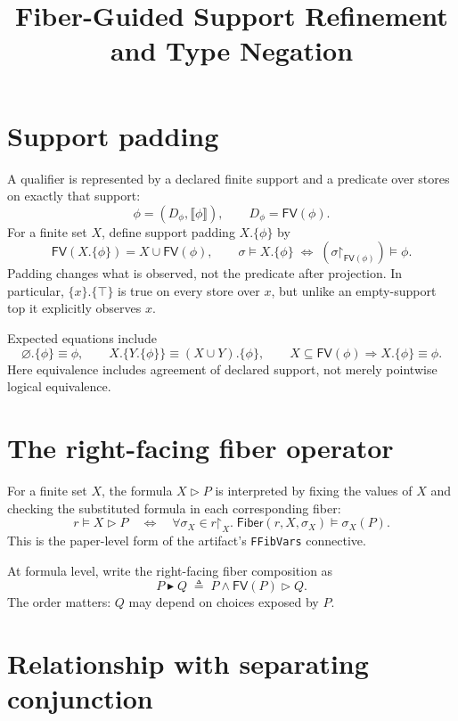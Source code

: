 \documentclass[10pt]{ctexart}
\title{Fiber-Guided Support Refinement and Type Negation}
\author{}
\date{}
\newcommand{\FV}{\mathsf{FV}}
\newcommand{\Fib}{\mathsf{Fiber}}
\newcommand{\restr}{\mathord{\upharpoonright}}
\newcommand{\fiber}[2]{#1\mathbin{\triangleright}#2}
\newcommand{\rfcomp}{\mathbin{\blacktriangleright}}
\newcommand{\modelsr}{\mathrel{\models}}
\begin{document}
\pagestyle{plain}
\maketitle

\section{Support padding}

A qualifier is represented by a declared finite support and a predicate over
stores on exactly that support:
\[
  \phi=(D_\phi,\llbracket\phi\rrbracket),
  \qquad D_\phi=\FV(\phi).
\]
For a finite set $X$, define support padding $X.\{\phi\}$ by
\[
  \FV(X.\{\phi\})=X\cup\FV(\phi),
  \qquad
  \sigma\modelsr X.\{\phi\}
  \;\Longleftrightarrow\;
  (\sigma\restr_{\FV(\phi)})\modelsr\phi.
\]
Padding changes what is observed, not the predicate after projection.  In
particular, $\{x\}.\{\top\}$ is true on every store over $x$, but unlike an
empty-support top it explicitly observes $x$.

Expected equations include
\[
  \varnothing.\{\phi\}\equiv\phi,
  \qquad
  X.\{Y.\{\phi\}\}\equiv(X\cup Y).\{\phi\},
  \qquad
  X\subseteq\FV(\phi)\Rightarrow X.\{\phi\}\equiv\phi.
\]
Here equivalence includes agreement of declared support, not merely
pointwise logical equivalence.

\section{The right-facing fiber operator}

For a finite set $X$, the formula $\fiber{X}{P}$ is interpreted by fixing the
values of $X$ and checking the substituted formula in each corresponding
fiber:
\begin{equation}\label{eq:fiber}
  r\modelsr\fiber{X}{P}
  \quad\Longleftrightarrow\quad
  \forall \sigma_X\in r\restr_X.\;
  \Fib(r,X,\sigma_X)\modelsr\sigma_X(P).
\end{equation}
This is the paper-level form of the artifact's \texttt{FFibVars} connective.

At formula level, write the right-facing fiber composition as
\begin{equation}\label{eq:fcomp}
  P\rfcomp Q
  \;\triangleq\;
  P\land\fiber{\FV(P)}{Q}.
\end{equation}
The order matters: $Q$ may depend on choices exposed by $P$.

\section{Relationship with separating conjunction}
\end{document}
